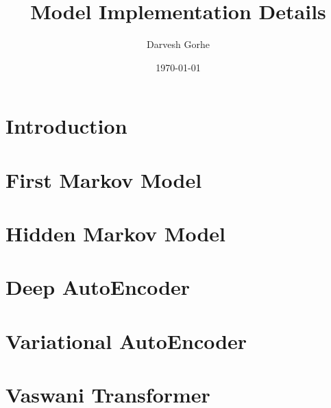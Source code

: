 \documentclass{article}
\author{Darvesh Gorhe}
\date{\today}
\title{Model Implementation Details}
\begin{document}
    \maketitle
    \tableofcontents
    \section{Introduction}
    
    \section{First Markov Model}
    
    \section{Hidden Markov Model}

    \section{Deep AutoEncoder}
    
    \section{Variational AutoEncoder}
    
    \section{Vaswani Transformer}
\end{document}

